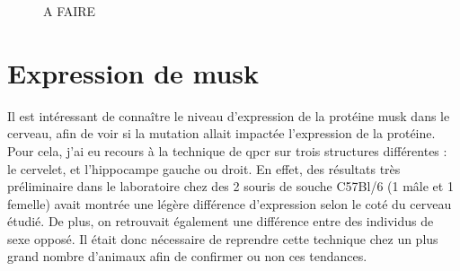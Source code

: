 \begin{figure}[h]
\begin{center}
\begin{subfigure}[h]{0.49\textwidth}
			\end{subfigure}
		\end{center}
		\caption{A FAIRE}
		\label{fig:WBResultat}
	\end{figure}

\section{Expression de \gls{musk}}
\label{sec:ExpressionMuSK}
	Il est intéressant de connaître le niveau d'expression de la protéine \gls{musk} dans le cerveau, afin de voir si la mutation allait impactée l'expression de la protéine. Pour cela, j'ai eu recours à la technique de \gls{qpcr} sur trois structures différentes : le cervelet, et l'hippocampe gauche ou droit. En effet, des résultats très préliminaire dans le laboratoire chez des 2 souris de souche C57Bl/6 (1 mâle et 1 femelle) avait montrée une légère différence d'expression selon le coté du cerveau étudié. De plus, on retrouvait également une différence entre des individus de sexe opposé. Il était donc nécessaire de reprendre cette technique chez un plus grand nombre d'animaux afin de confirmer ou non ces tendances.
